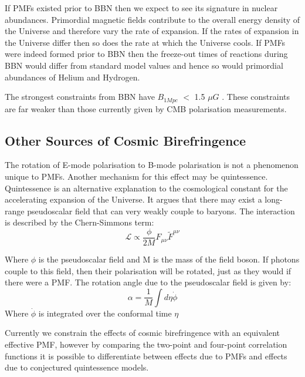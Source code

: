If PMFs existed prior to BBN then we expect to see its signature in nuclear abundances. Primordial magnetic fields contribute to the overall energy density of the Universe and therefore vary the rate of expansion. If the rates of expansion in the Universe differ then so does the rate at which the Universe cools. If PMFs were indeed formed prior to BBN then the freeze-out times of reactions during BBN would differ from standard model values and hence so would primordial abundances of Helium and Hydrogen.

The strongest constraints from BBN have $B_{1Mpc}$ $<$ 1.5 $\mu G$ \cite{PhysRevD.86.063003}. These constraints are far weaker than those currently given by CMB polarisation measurements.

\subsection{Other Sources of Cosmic Birefringence}
The rotation of E-mode polarisation to B-mode polarisation is not a phenomenon unique to PMFs. Another mechanism for this effect may be quintessence. Quintessence is an alternative explanation to the cosmological constant for the accelerating expansion of the Universe. It argues that there may exist a long-range pseudoscalar field that can very weakly couple to baryons. The interaction is described by the Chern-Simmons term:
\begin{equation}
\label{eqn:chern}
\mathcal{L} \propto \frac{\phi}{2M}F_{\mu \nu}\tilde{F}^{\mu \nu}
\end{equation}

Where $\phi$ is the pseudoscalar field and M is the mass of the field boson. If photons couple to this field, then their polarisation will be rotated, just as they would if there were a PMF. The rotation angle due to the pseudoscalar field is given by:
\begin{equation}
\label{eqn:rotation}
\alpha = \frac{1}{M} \int{d\eta \dot{\phi}}
\end{equation}
Where $\dot{\phi}$ is integrated over the conformal time $\eta$

Currently we constrain the effects of cosmic birefringence with an equivalent effective PMF, however by comparing the two-point and four-point correlation functions it is possible to differentiate between effects due to PMFs and effects due to conjectured quintessence models. \cite{Ade:2015cao}




